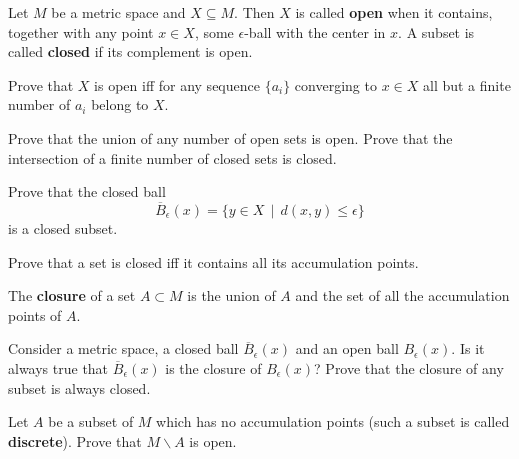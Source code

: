\documentclass[12pt]{article}
\begin{document}



\begin{opredelenie} Let $M$ be a metric space and $X\subseteq M$.
Then $X$ is called {\bf open} when it contains,
together with any point $x\in X$, some  $\epsilon$-ball with the center in $x$.
A subset is called {\bf closed} if its complement is open.
\end{opredelenie}

\begin{zadacha} Prove that $X$ is open iff for any sequence $\{a_i\}$
  converging to $x\in X$ all but a finite number of $a_i$ belong
  to $X$.
\end{zadacha}

\begin{zadacha} Prove that the union of any number of open sets is
  open. Prove that the intersection of a finite number of closed sets
  is closed.
\end{zadacha}

\begin{zadacha} Prove that the closed ball
$$ 
\overline B_\epsilon(x) = \{ y \in X \ \ | \ \ d(x,y)\leq \epsilon\}
$$
is a closed subset.
\end{zadacha}

\begin{zadacha} Prove that a set is closed iff it contains all its
  accumulation points.
\end{zadacha}

\begin{opredelenie} The {\bf closure} of a set $A\subset M$ 
is the union of  $A$ and the set of all the accumulation points of $A$.
\end{opredelenie}

\begin{zadacha} 
Consider a metric space, a closed ball $\overline B_\epsilon(x)$ 
and an open ball $B_\epsilon(x)$. 
Is it always true that  $\overline B_\epsilon(x)$ is
the closure of $B_\epsilon(x)$? Prove that the closure of any subset is
always closed.
\end{zadacha}

\begin{zadacha} \label{_DISKRE_Zadacha_}
Let $A$ be a subset of $M$ which has no accumulation points (such a
subset is called {\bf discrete}). Prove that $M \backslash A$ is open.
\end{zadacha}
\end{document}
